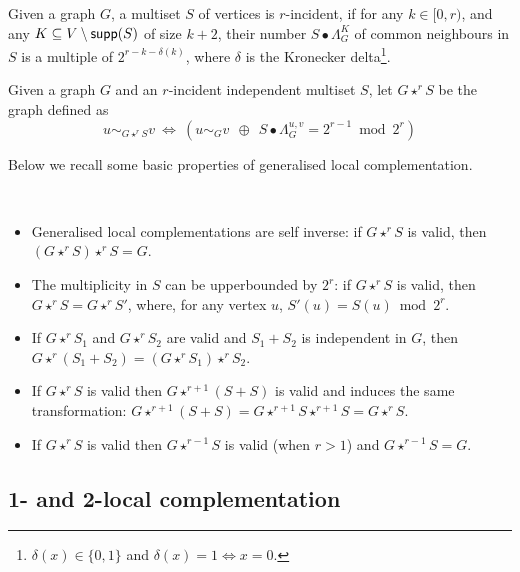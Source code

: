 \documentclass[a4paper,UKenglish,cleveref,autoref,thm-restate]{arxiv}
\newcommand{\supp}{\textup{\textsf{supp}}}
\begin{document}
\begin{definition}[$r$-Incidence]\label{def:r-inc}
    Given a graph $G$, a multiset $S$ of vertices is  $r$-incident, if for any $k\in [0,r)$, and any $K\subseteq V\setminus \supp(S)$ of size $k+2$, their number $S\bullet \Lambda_G^K$ of common neighbours in $S$ is a multiple of $2^{r-k-\delta(k)}$,
    where $\delta$ is the Kronecker delta\footnote{$\delta(x)\in \{0,1\}$ and $\delta(x)=1 \Leftrightarrow x=0$.
    }.
\end{definition}
 
\begin{definition}\label{def:r-LC}
    Given a graph $G$ and an $r$-incident independent multiset $S$, let $G\star^rS$ be the graph defined as
    $$u\sim_{G\star^r S} v ~\Leftrightarrow~\left(u\sim_{G} v ~~\oplus~~ S \bullet\Lambda_G^{u,v} = 2^{r-1}\bmod 2^{r}\right)$$
\end{definition}



\noindent
Below we recall some basic properties of generalised local complementation.

\begin{proposition}{\bf \cite{claudet2024local}}
    ~
    \begin{itemize}
        \item Generalised local complementations are self inverse: if $G\star^r S$ is valid, then $(G \star^r S ) \star^r S = G$.
        \item The multiplicity in $S$ can be upperbounded by $2^r$: if $G\star^r S$ is valid, then $G\star^r S= G\star^r S'$, where, for any vertex $u$, $S'(u)=S(u)\bmod 2^r$.
        \item If $G\star^r S_1$ and $G\star^r S_2$ are valid and  $S_1 + S_2$ is independent in $G$, then $G\star^r (S_1+ S_2) = (G\star^r S_1)\star^r S_2$. \item If $G\star^r S$ is valid then $G\star^{r+1} (S + S)$ is valid and induces the same transformation: $G\star^{r+1} (S + S) = G\star^{r+1} S\star^{r+1} S = G\star^rS$.\item If $G\star^r S$ is valid then $G\star^{r-1} S$ is valid (when $r>1$) and  $G\star^{r-1} S = G$.
    \end{itemize}
\end{proposition}


\subsection{1- and 2-local complementation} 
\end{document}
